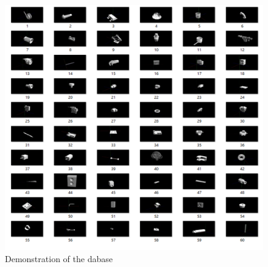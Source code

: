 \begin{figure}[h]
\centering
\includegraphics[width=0.95\linewidth]{database_models}
\caption{Demonstration of the dabase} \label{database_models}
\end{figure}


